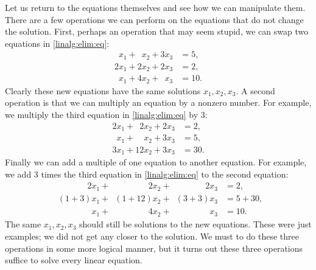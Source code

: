 Let us return to the equations themselves and see how we can manipulate
them.
There are a few operations we can perform on the equations that do not change
the solution.  First, perhaps an operation that may seem stupid, we can swap 
two equations in \eqref{linalg:elim:eq}:
\begin{equation*}
\begin{aligned}
\phantom{9} x_1 + \phantom{9} x_2 +           3 x_3 & = 5 , \\
          2 x_1 +           2 x_2 +           2 x_3 & = 2 , \\
\phantom{9} x_1 +           4 x_2 + \phantom{9} x_3 & = 10 .
\end{aligned}
\end{equation*}
Clearly these new equations have the same solutions $x_1,x_2,x_3$.
A second operation is that we can multiply an equation by a nonzero number.  For
example, we multiply the third equation in \eqref{linalg:elim:eq}
by 3:
\begin{equation*}
\begin{aligned}
          2 x_1 + \phantom{9}  2 x_2 + 2 x_3 & = 2 , \\
\phantom{9} x_1 + \phantom{99}   x_2 + 3 x_3 & = 5 , \\
          3 x_1 +             12 x_2 + 3 x_3 & = 30 .
\end{aligned}
\end{equation*}
Finally we can add a multiple of one equation to another equation.
For example, we add 3 times the third equation in \eqref{linalg:elim:eq}
to the second equation:
\begin{equation*}
\begin{aligned}
\phantom{(1+3)} 2 x_1 + \phantom{(1+12)}  2 x_2 + \phantom{(3+3)} 2 x_3 & = 2 , \\
\phantom{2} (1+3) x_1 + \phantom{2}(1+12)   x_2 + \phantom{2} (3+3) x_3 & = 5+30 , \\
\phantom{2 (1+3)} x_1 + \phantom{(1+12)}  4 x_2 + \phantom{(3+3) 2} x_3 & = 10 .
\end{aligned}
\end{equation*}
The same $x_1,x_2,x_3$ should still be solutions
to the new equations.
These were just examples; we did not get any closer to the solution.
We must to do these three operations in some more logical manner,
but it turns out
these three operations suffice to solve every linear equation.

